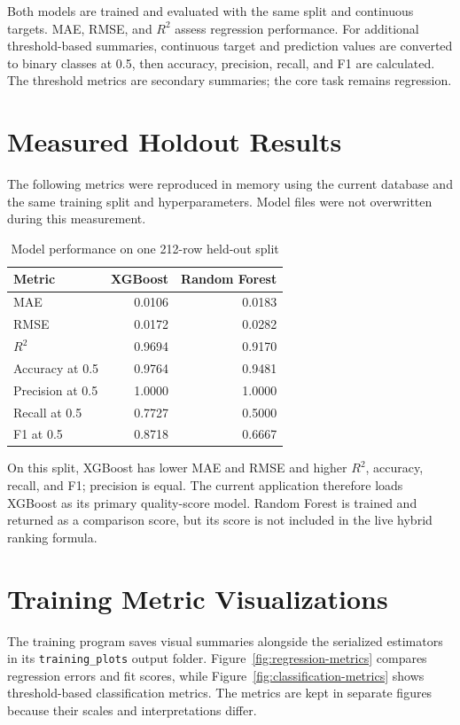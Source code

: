 \documentclass[12pt,a4paper]{report}
\begin{document}
Both models are trained and evaluated with the same split and continuous targets. MAE,
RMSE, and $R^2$ assess regression performance. For additional threshold-based
summaries, continuous target and prediction values are converted to binary classes at
0.5, then accuracy, precision, recall, and F1 are calculated. The threshold metrics are
secondary summaries; the core task remains regression.

\section{Measured Holdout Results}
The following metrics were reproduced in memory using the current database and the
same training split and hyperparameters. Model files were not overwritten during this
measurement.

\begin{table}[H]
\centering
\caption{Model performance on one 212-row held-out split}
\begin{tabular}{lrr}
\toprule
Metric & XGBoost & Random Forest\\
\midrule
MAE & 0.0106 & 0.0183\\
RMSE & 0.0172 & 0.0282\\
$R^2$ & 0.9694 & 0.9170\\
Accuracy at 0.5 & 0.9764 & 0.9481\\
Precision at 0.5 & 1.0000 & 1.0000\\
Recall at 0.5 & 0.7727 & 0.5000\\
F1 at 0.5 & 0.8718 & 0.6667\\
\bottomrule
\end{tabular}
\end{table}

On this split, XGBoost has lower MAE and RMSE and higher $R^2$, accuracy, recall, and
F1; precision is equal. The current application therefore loads XGBoost as its primary
quality-score model. Random Forest is trained and returned as a comparison score, but
its score is not included in the live hybrid ranking formula.

\section{Training Metric Visualizations}
The training program saves visual summaries alongside the serialized estimators in its
\texttt{training\_plots} output folder. Figure~\ref{fig:regression-metrics}
compares regression errors and fit scores, while Figure~\ref{fig:classification-metrics}
shows threshold-based classification metrics. The metrics are kept in separate figures
because their scales and interpretations differ.
\end{document}
